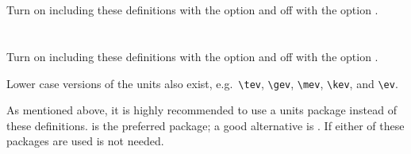 \newpage
\onecolumn
\section{}

Turn on including these definitions with the option  and off with the option .


\twocolumn


\newpage
\section{}

Turn on including these definitions with the option  and off with the option .



\noindent Lower case versions of the units also exist, e.g.\ \verb|\tev|, \verb|\gev|, \verb|\mev|, \verb|\kev|, and
\verb|\ev|. 

As mentioned above, it is highly recommended to use a units package instead of
these definitions.  is the preferred package; a good alternative is .
If either of these packages are used  is not needed.

